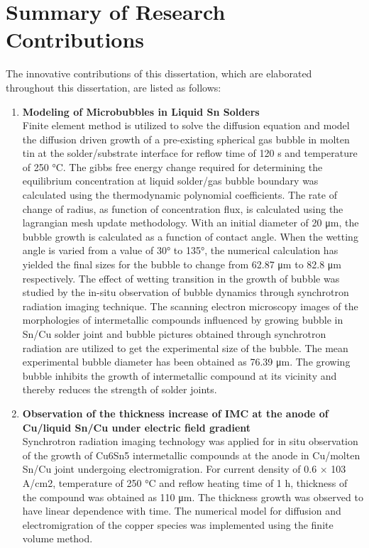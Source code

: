 \section{Summary of Research Contributions}\label{Chap1_02}

The innovative contributions of this dissertation, which are elaborated throughout this dissertation, are listed as follows:
\begin{enumerate}
    \item \textbf{Modeling of Microbubbles in Liquid Sn Solders}
    \\
   Finite element method is utilized to solve the diffusion equation and model the diffusion driven growth of a pre-existing spherical gas bubble in molten tin at the solder/substrate interface for reflow time of 120 s and temperature of 250 °C. The gibbs free energy change required for determining the equilibrium concentration at liquid solder/gas bubble boundary was calculated using the thermodynamic polynomial coefficients. The rate of change of radius, as function of concentration flux, is calculated using the lagrangian mesh update methodology. With an initial diameter of 20 μm, the bubble growth is calculated as a function of contact angle. When the wetting angle is varied from a value of 30° to 135°, the numerical calculation has yielded the final sizes for the bubble to change from 62.87 μm to 82.8 μm respectively. The effect of wetting transition in the growth of bubble was studied by the in-situ observation of bubble dynamics through synchrotron radiation imaging technique. The scanning electron microscopy images of the morphologies of intermetallic compounds influenced by growing bubble in Sn/Cu solder joint and bubble pictures obtained through synchrotron radiation are utilized to get the experimental size of the bubble. The mean experimental bubble diameter has been obtained as 76.39 μm. The growing bubble inhibits the growth of intermetallic compound at its vicinity and thereby reduces the strength of solder joints.
    \item \textbf{Observation of the thickness increase of IMC at the anode of Cu/liquid Sn/Cu under electric field gradient}
    \\
    Synchrotron radiation imaging technology was applied for in situ observation of the growth of Cu6Sn5 intermetallic compounds at the anode in Cu/molten Sn/Cu joint undergoing electromigration. For current density of 0.6 × 103 A/cm2, temperature of 250 °C and reflow heating time of 1 h, thickness of the compound was obtained as 110 μm. The thickness growth was observed to have linear dependence with time. The numerical model for diffusion and electromigration of the copper species was implemented using the finite volume method.
    

\end{enumerate}
